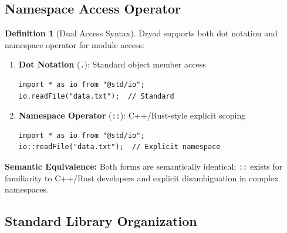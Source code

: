 \documentclass[12pt,a4paper]{article}
\theoremstyle{definition}
\newtheorem{definition}{Definition}[section]
\begin{document}
\subsection{Namespace Access Operator}

\begin{definition}[Dual Access Syntax]
Dryad supports both dot notation and namespace operator for module access:

\begin{enumerate}[leftmargin=*]
    \item \textbf{Dot Notation} (\texttt{.}): Standard object member access
    \begin{lstlisting}[language=Dryad]
import * as io from "@std/io";
io.readFile("data.txt");  // Standard
    \end{lstlisting}
    
    \item \textbf{Namespace Operator} (\texttt{::}): C++/Rust-style explicit scoping
    \begin{lstlisting}[language=Dryad]
import * as io from "@std/io";
io::readFile("data.txt");  // Explicit namespace
    \end{lstlisting}
\end{enumerate}

\textbf{Semantic Equivalence:} Both forms are semantically identical; \texttt{::} exists for familiarity to C++/Rust developers and explicit disambiguation in complex namespaces.
\end{definition}

\subsection{Standard Library Organization}
\end{document}
